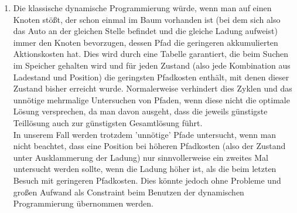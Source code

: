 \documentclass[a4paper,10pt]{article}
\begin{document}
\begin{enumerate}[~~a)]
\begin{enumerate}[1.]
\begin{center}
            \end{center}
    \end{enumerate}

    \item 
    Die klassische dynamische Programmierung würde, wenn man auf einen Knoten stößt, der schon einmal im Baum vorhanden ist (bei dem sich also das Auto an der gleichen Stelle befindet und die gleiche Ladung aufweist) immer den Knoten bevorzugen, dessen Pfad die geringeren akkumulierten Aktionskosten hat. Dies wird durch eine Tabelle garantiert, die beim Suchen im Speicher gehalten wird und für jeden Zustand (also jede Kombination aus Ladestand und Position) die geringsten Pfadkosten enthält, mit denen dieser Zustand bisher erreicht wurde. Normalerweise verhindert dies Zyklen und das unnötige mehrmalige Untersuchen von Pfaden, wenn diese nicht die optimale Lösung versprechen, da man davon ausgeht, dass die jeweils günstigste Teillösung auch zur günstigsten Gesamtlösung führt. \\
    In unserem Fall werden trotzdem 'unnötige' Pfade untersucht, wenn man nicht beachtet, dass eine Position bei höheren Pfadkosten (also der Zustand unter Ausklammerung der Ladung) nur sinnvollerweise ein zweites Mal untersucht werden sollte, wenn die Ladung höher ist, als die beim letzten Besuch mit geringeren Pfadkosten. Dies könnte jedoch ohne Probleme und großen Aufwand als Constraint beim Benutzen der dynamischen Programmierung übernommen werden.
\end{enumerate}
\end{document}
